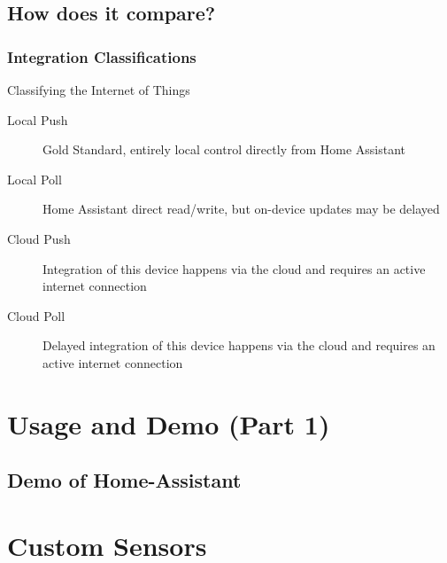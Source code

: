 \documentclass[aspectratio=169]{beamer}
\begin{document}
\subsection{How does it compare?}
\frame{\subsectionpage}
\begin{frame}[fragile]
  \frametitle{Integration Classifications}
  Classifying the Internet of Things
  \vfill
  \begin{description}%
    \item[Local Push]{Gold Standard, entirely local control directly from Home Assistant}
    \item[Local Poll]{Home Assistant direct read/write, but on-device updates may be delayed}
    \item[Cloud Push]{Integration of this device happens via the cloud and requires an active internet connection}
    \item[Cloud Poll]{Delayed integration of this device happens via the cloud and requires an active internet connection}
  \end{description}
\end{frame}

\section{Usage and Demo (Part 1)}
\subsection{Demo of Home-Assistant}
\frame{\subsectionpage}

\section{Custom Sensors}
\frame{\sectionpage}
\end{document}

